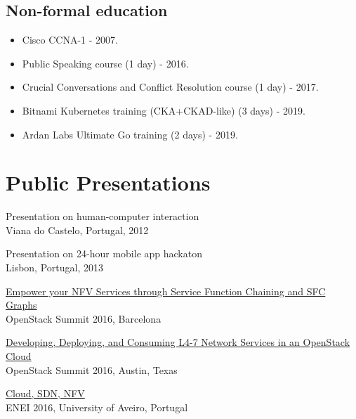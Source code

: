\documentclass[letter,10pt]{article} %
\begin{document}
\subsection{Non-formal education}
\begin{itemize}
    \item Cisco CCNA-1 - 2007.
    \item Public Speaking course (1 day) - 2016.
    \item Crucial Conversations and Conflict Resolution course (1 day) - 2017.
    \item Bitnami Kubernetes training (CKA+CKAD-like) (3 days) - 2019.
    \item Ardan Labs Ultimate Go training (2 days) - 2019.
\end{itemize}

\newpage


\section{Public Presentations}
Presentation on human-computer interaction\\
Viana do Castelo, Portugal, 2012

Presentation on 24-hour mobile app hackaton\\
Lisbon, Portugal, 2013

\href{https://www.slideshare.net/igordcard/empower-your-nfv-services-through-service-function-chaining-and-sfc-graphs}{Empower your NFV Services through Service Function Chaining and SFC Graphs}\\
OpenStack Summit 2016, Barcelona

\href{https://www.slideshare.net/igordcard/developing-deploying-and-consuming-l47-network-services-in-an-openstack-cloud}{Developing, Deploying, and Consuming L4-7 Network Services in an OpenStack Cloud}\\
OpenStack Summit 2016, Austin, Texas

\href{https://www.slideshare.net/igordcard/cloud-sdn-nfv}{Cloud, SDN, NFV}\\
ENEI 2016, University of Aveiro, Portugal
\end{document}
